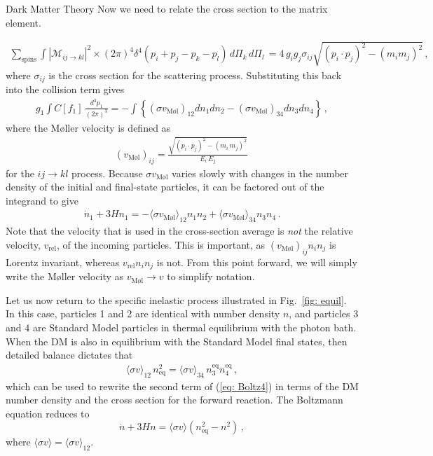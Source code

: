 \documentclass[10pt,a4paper]{book}
\begin{document}
\begin{chapter}{Dark Matter Theory}
		Now we need to relate the cross section to the matrix element. 
		
		\begin{eqnarray}
		\sum_\text{spins} \int |\mathcal{M}_{ij\rightarrow kl}|^2 \times (2\pi)^4 \delta^4(p_i + p_j -p_k- p_l) \, d \Pi_k \, d \Pi_l \,  = 4 \, g_i g_j  \sigma_{ij} \sqrt{(p_i \cdot p_j)^2 - (m_i m_j)^2} \, ,\nonumber 
		\end{eqnarray}
		where $\sigma_{ij}$ is the cross section for the scattering process.  Substituting this back into the collision term gives  
		\begin{align*}
		g_1 \int C[f_1] \, \frac{d^3 p_1}{(2 \pi)^3} = -\int \left\{ \left(\sigma v_\text{M\o l}\right)_{12} dn_1 dn_2 - \left(\sigma v_\text{M\o l}\right)_{34} dn_3 dn_4 \right\} \, , \nonumber
		\end{align*}
		where the M\o ller velocity is defined as 
		\begin{align*}
		\left(v_\text{M\o l} \right)_{ij}= \frac{\sqrt{(p_i \cdot p_j)^2 - (m_i \, m_j)^2}}{E_i \, E_j} \,  \nonumber
		\end{align*}
		for the $ij\rightarrow kl$ process.  Because $\sigma v_\text{M\o l}$ varies slowly with changes in the number density of the initial and final-state particles, it can be factored out of the integrand to give
		\begin{align*}
		\dot{n}_1 + 3 H n_1 = - \langle \sigma v_\text{M\o l} \rangle_{12} n_1 n_2 + \langle \sigma v_\text{M\o l} \rangle_{34}  n_3 n_4  \, . 
		\label{eq: Boltz4}
		\end{align*}
		Note that the velocity that is used in the cross-section average is \emph{not} the relative velocity, $v_\text{rel}$, of the incoming particles.  This is important, as $\left(v_\text{M\o l}\right)_{ij} n_i n_j$ is Lorentz invariant, whereas $ v_\text{rel} n_i n_j$ is not.  From this point forward, we will simply write the M\o ller velocity as $v_\text{M\o l} \rightarrow v$ to simplify notation.
		
		Let us now return to the specific inelastic process illustrated in Fig.~\ref{fig: equil}.  In this case, particles 1 and 2 are identical with number density $n$, and particles 3 and 4 are Standard Model particles in thermal equilibrium with the photon bath.  When the DM is also in equilibrium with the Standard Model final states, then detailed balance dictates that  
		\begin{align*}
		\langle \sigma v \rangle_{12} \, n_\text{eq}^2 = \langle \sigma v\rangle_{34} \, n_3^\text{eq} n_4^\text{eq}  \,,   \nonumber
		\end{align*}
		which can be used to rewrite the second term of (\ref{eq: Boltz4}) in terms of the DM number density and the cross section for the forward reaction.  The Boltzmann equation reduces to
		\begin{equation}
		\dot{n} + 3 H n = \langle \sigma v \rangle \left( n_\text{eq}^2 - n^2 \right) \, ,
		\label{eq: BoltzN1}
		\end{equation}
		where $\langle \sigma v \rangle = \langle \sigma v \rangle_{12}$.  
		
	\end{chapter}
\end{document}
